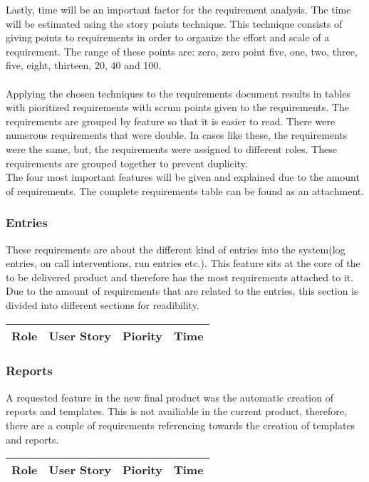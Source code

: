\documentclass[paper=a4, fontsize=11pt,twoside]{scrartcl}	%
\begin{document}
Lastly, time will be an important factor for the requirement analysis. The time will be estimated using the story points technique. This technique consists of giving  points to requirements in order to organize the effort and scale of a requirement. The range of these points are:  zero, zero point five, one, two, three, five, eight, thirteen, 20, 40 and 100. \\ \\
Applying the chosen techniques to the requirements document results in tables with pioritized requirements with scrum points given to the requirements. The requirements are grouped by feature so that it is easier to read. There were numerous requirements that were double. In cases like these, the requirements were the same, but, the requirements were assigned to different roles. These requirements are grouped together to prevent duplicity. \\
The four most important features will be given and explained due to the amount of requirements. The complete requirements table can be found as an attachment.\\

\subsubsection{Entries}
These requirements are about the different kind of entries into the system(log entries, on call interventions, run entries etc.). This feature sits at the core of the to be delivered product and therefore has the most requirements attached to it. Due to the amount of requirements that are related to the entries, this section is divided into different sections for readibility. 

\begin{longtable}{ | p{2cm} | p{8cm} | p{1.5cm} | l |}
\hline
Role & User Story & Piority & Time \\ \hline
\end{longtable}


\subsubsection{Reports}
A requested feature in the new final product was the automatic creation of reports and templates. This is not availiable in the current product, therefore, there are a couple of requirements referencing towards the creation of templates and reports.
\begin{longtable}{ | p{2cm} | p{8cm} | p{1.5cm} | l |}
\hline
Role & User Story & Piority & Time \\ \hline
\end{longtable}
\end{document}
